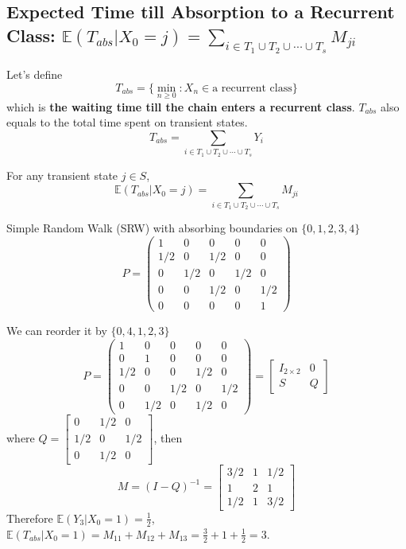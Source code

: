 \documentclass[11pt]{elegantbook}
\begin{document}
\subsection{Expected Time till Absorption to a Recurrent Class: $\mathbb{E}(T_{abs}|X_0=j)=\sum_{i\in T_1\cup T_2\cup\cdots\cup T_s} M_{ji}$}
Let's define $$T_{abs}=\{\min_{n\geq 0}: X_n\in \text{a recurrent class}\}$$
which is \textbf{the waiting time till the chain enters a recurrent class}.
$T_{abs}$ also equals to the total time spent on transient states. $$T_{abs}=\sum_{i\in T_1\cup T_2\cup\cdots\cup T_s}Y_i$$
\begin{corollary}
    For any transient state $j\in S$, $$\mathbb{E}(T_{abs}|X_0=j)=\sum_{i\in T_1\cup T_2\cup\cdots\cup T_s} M_{ji}$$
\end{corollary}
\begin{example}
    Simple Random Walk (SRW) with absorbing boundaries on $\{0,1,2,3,4\}$
    $$P=\left(\begin{array}{ccccc}
    1 & 0 & 0 & 0 & 0 \\
    1 / 2 & 0 & 1 / 2 & 0 & 0 \\
    0 & 1 / 2 & 0 & 1 / 2 & 0 \\
    0 & 0 & 1 / 2 & 0 & 1 / 2 \\
    0 & 0 & 0 & 0 & 1
    \end{array}\right)$$
\end{example}
We can reorder it by $\{0,4,1,2,3\}$
$$P=\left(\begin{array}{ccccc}
    1 & 0 & 0 & 0 & 0 \\
    0 & 1 & 0 & 0 & 0 \\
    1 / 2 & 0 & 0 & 1 / 2 & 0 \\
    0 & 0 & 1 / 2 & 0 & 1 / 2 \\
    0 & 1 / 2 & 0& 1 / 2 & 0
    \end{array}\right)=\begin{bmatrix}
        I_{2\times 2}&	0\\
        S	& Q
    \end{bmatrix}$$
where $Q=\begin{bmatrix}
    0 & 1 / 2 & 0 \\
    1 / 2 & 0 & 1 / 2 \\
    0& 1 / 2 & 0
\end{bmatrix}$, then $$M=(I-Q)^{-1}=\begin{bmatrix}
    3/2 & 1 & 1/2 \\
    1 & 2 & 1 \\
    1/2& 1 & 3/2
\end{bmatrix}$$
Therefore $\mathbb{E}(Y_3|X_0=1)=\frac{1}{2}$, $\mathbb{E}(T_{abs}|X_0=1)=M_{11}+M_{12}+M_{13}=\frac{3}{2}+1+\frac{1}{2}=3$.
\end{document}
